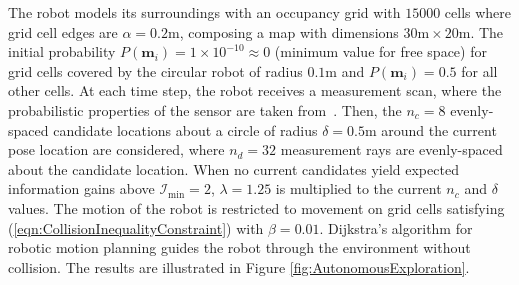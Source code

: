 \documentclass[letterpaper, 10pt, conference]{ieeeconf}
\newcommand{\refeqn}[1]{(\ref{eqn:#1})}
\begin{document}
The robot models its surroundings with an occupancy grid with $15000$ cells where grid cell edges are $\alpha=0.2$m, composing a map with dimensions $30\text{m}\times20\text{m}$. The initial probability $P(\mathbf{m}_i)=1\times10^{-10}\approx0$ (minimum value for free space) for grid cells covered by the circular robot of radius $0.1$m and $P(\mathbf{m}_i)=0.5$ for all other cells.
At each time step, the robot receives a measurement scan, where the probabilistic properties of the sensor are taken from~\cite{PirRutBisSch11,KhoElb12}. Then, the $n_c=8$ evenly-spaced candidate locations about a circle of radius $\delta=0.5$m around the current pose location are considered, where $n_d=32$ measurement rays are evenly-spaced about the candidate location.  When no current candidates yield expected information gains above $\mathcal I_\text{min}=2$, $\lambda=1.25$ is multiplied to the current $n_c$ and $\delta$ values. The motion of the robot is restricted to movement on grid cells satisfying \refeqn{CollisionInequalityConstraint} with $\beta=0.01$. Dijkstra's algorithm for robotic motion planning guides the robot through the environment without collision. The results are illustrated in Figure \ref{fig:AutonomousExploration}.
\end{document}
